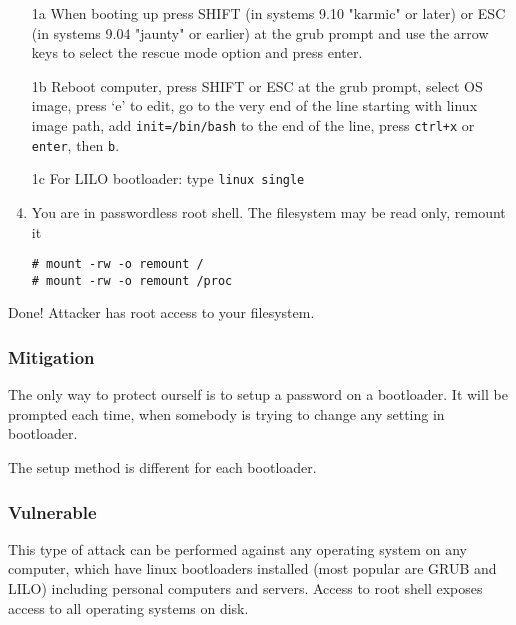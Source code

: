 \begin{enumerate}
    \item[1a] When booting up press SHIFT (in systems 9.10 "karmic" or later) or ESC (in systems 9.04 "jaunty" or earlier) at the grub prompt and use the arrow keys to select the rescue mode option and press enter. 

    \item[1b] Reboot computer, press SHIFT or ESC at the grub prompt, select OS image, press `e' to edit, go to the very end of the line starting with linux image path, add \texttt{init=/bin/bash} to the end of the line, press \texttt{ctrl+x} or \texttt{enter}, then \texttt{b}.

    \item[1c] For LILO bootloader: type \verb|linux single|

    \item You are in passwordless root shell. The filesystem may be read only, remount it

\begin{verbatim}
# mount -rw -o remount /
# mount -rw -o remount /proc
\end{verbatim}

\end{enumerate}

Done! Attacker has root access to your filesystem.


\subsubsection*{Mitigation}
The only way to protect ourself is to setup a password on a bootloader. It will be prompted each time, when somebody is trying to change any setting in bootloader. 

The setup method is different for each bootloader.

\subsubsection*{Vulnerable}
This type of attack can be performed against any operating system on any computer, which have linux bootloaders installed (most popular are GRUB and LILO) including personal computers and servers. Access to root shell exposes access to all operating systems on disk.
